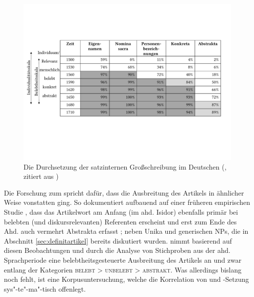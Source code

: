\begin{figure}
\includegraphics[width=\textwidth]{images/Substantivgrossschreibung.pdf}
\caption {Die Durchsetzung der satzinternen Großschreibung im Deutschen (\citealt{Bergmann1999}, zitiert aus \citealt[351]{Szczepaniak2011})\label{sgs}}
\end{figure} 

Die Forschung zum  spricht dafür, dass die Ausbreitung des Artikels in ähnlicher Weise vonstatten ging. So dokumentiert \textcite[]{Oubouzar1992} aufbauend auf einer früheren empirischen Studie \parencite{Oubouzar1989}, dass das  Artikelwort  am Anfang (im ahd. Isidor) ebenfalls primär bei belebten  (und diskursrelevanten) Referenten erscheint \parencite[vgl. insbesondere][566--567]{Oubouzar1989} und erst zum Ende des Ahd. auch vermehrt Abstrakta  erfasst \parencite[][572]{Oubouzar1989}; neben Unika  und generischen  NPs, die in Abschnitt \ref{sec:definitartikel} bereits diskutiert wurden. \textcite[73--78]{Szczepaniak2011} nimmt basierend auf diesen Beobachtungen und durch die Analyse von Stichproben aus der ahd. Sprachperiode eine belebtheitsgesteuerte  Ausbreitung  des Artikels an und zwar entlang der Kategorien \textsc{belebt > unbelebt > abstrakt}. Was allerdings bislang noch fehlt, ist eine  Korpusuntersuchung, welche die Korrelation von  und -Setzung sys"-te"-ma"-tisch offenlegt. 

